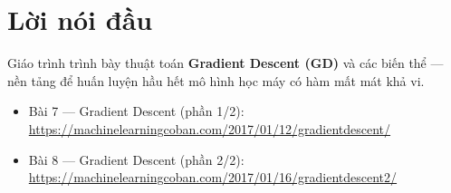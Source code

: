 \documentclass[12pt,a4paper]{article}
\newcommand{\mlcburl}[1]{\url{#1}}
\begin{document}

\newpage
\tableofcontents
\newpage

\section*{Lời nói đầu}

\begin{ynghia}[title={Vị trí trong giáo trình}]
Giáo trình trình bày thuật toán \textbf{Gradient Descent (GD)} và các biến thể --- nền tảng để huấn luyện hầu hết mô hình học máy có hàm mất mát khả vi.
\end{ynghia}

\begin{phuongphap}[title={Tài liệu tham chiếu gốc}]
\begin{itemize}
  \item Bài 7 --- Gradient Descent (phần 1/2): \mlcburl{https://machinelearningcoban.com/2017/01/12/gradientdescent/}
  \item Bài 8 --- Gradient Descent (phần 2/2): \mlcburl{https://machinelearningcoban.com/2017/01/16/gradientdescent2/}
\end{itemize}
\end{phuongphap}

\newpage




\end{document}
